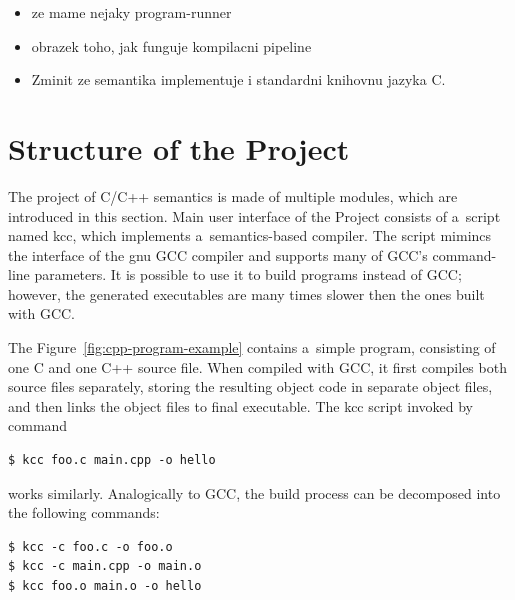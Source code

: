 \documentclass[nolot,nolof,nocover,printed]{fithesis3}
\begin{document}

\begin{itemize}
\item ze mame nejaky program-runner
\item obrazek toho, jak funguje kompilacni pipeline
\item Zminit ze semantika implementuje i standardni knihovnu jazyka C.
\end{itemize}

\section{Structure of the Project}



The project of C/C++ semantics is made of multiple modules, which are introduced in this section. 
Main user interface of the Project consists of a~script named kcc, which implements a~semantics-based compiler. The script mimincs the interface of the gnu GCC compiler and supports many of GCC's command-line parameters. It is possible to use it to build programs instead of GCC; however, the generated executables are many times slower then the ones built with GCC.

The Figure~\ref{fig:cpp-program-example} contains a~simple program, consisting of one C and one C++ source file. When compiled with GCC, it first compiles both source files separately, storing the resulting object code in separate object files, and then links the object files to final executable. The kcc script invoked by command
\begin{lstlisting}
$ kcc foo.c main.cpp -o hello
\end{lstlisting}
works similarly. Analogically to GCC, the build process can be decomposed into the following commands:
\begin{lstlisting}
$ kcc -c foo.c -o foo.o
$ kcc -c main.cpp -o main.o
$ kcc foo.o main.o -o hello
\end{lstlisting}
\end{document}
